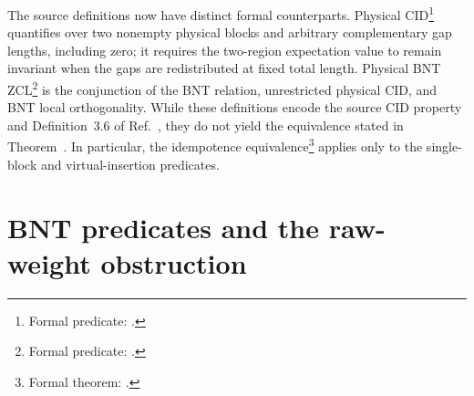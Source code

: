 \documentclass{article}
\begin{document}
The source definitions now have distinct formal counterparts. Physical
CID\footnote{Formal predicate: .} quantifies
over two nonempty physical blocks and arbitrary complementary gap lengths,
including zero; it requires the two-region expectation value to remain invariant
when the gaps are redistributed at fixed total length. Physical BNT
ZCL\footnote{Formal predicate: .} is the
conjunction of the BNT relation, unrestricted physical CID, and BNT local
orthogonality. While these definitions encode the source CID property and
Definition~3.6 of Ref.~\cite{Cirac2016MPDO_arXiv}, they do not
yield the equivalence stated in Theorem~. In particular,
the idempotence equivalence\footnote{Formal theorem:
.} applies only to the
single-block and virtual-insertion predicates.

\section{BNT predicates and the raw-weight obstruction}
\end{document}
